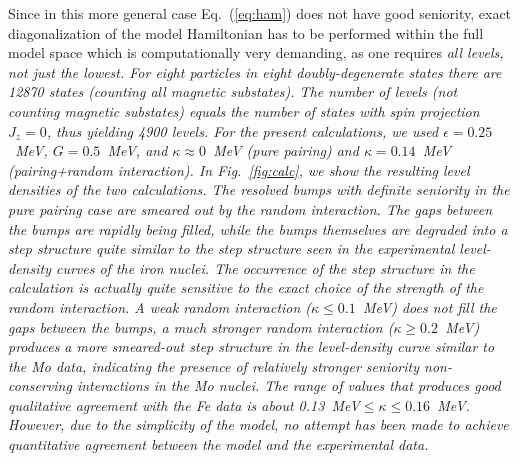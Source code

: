 \begin{multicols}{2}
Since in this more general case Eq.\ (\ref{eq:ham}) does not have good 
seniority, exact diagonalization of the model Hamiltonian has to be performed 
within the full model space which is computationally very demanding, as one 
requires \it all \rm levels, not just the lowest. For eight particles in eight 
doubly-degenerate states there are 12870 states (counting all magnetic 
substates). The number of levels (not counting magnetic substates) equals the 
number of states with spin projection $J_z=0$, thus yielding 4900 levels. For 
the present calculations, we used $\epsilon=0.25$~MeV, $G=0.5$~MeV, and 
$\kappa\approx 0$~MeV (pure pairing) and $\kappa=0.14$~MeV (pairing+random 
interaction). In Fig.\ \ref{fig:calc}, we show the resulting level densities of
the two calculations. The resolved bumps with definite seniority in the pure 
pairing case are smeared out by the random interaction. The gaps between the 
bumps are rapidly being filled, while the bumps themselves are degraded into a 
step structure quite similar to the step structure seen in the experimental 
level-density curves of the iron nuclei. The occurrence of the step structure 
in the calculation is actually quite sensitive to the exact choice of the 
strength of the random interaction. A weak random interaction 
($\kappa\le 0.1$~MeV) does not fill the gaps between the bumps, a much stronger
random interaction ($\kappa\ge 0.2$~MeV) produces a more smeared-out step 
structure in the level-density curve similar to the Mo data, indicating the 
presence of relatively stronger seniority non-conserving interactions in the Mo
nuclei. The range of values that produces good qualitative agreement with the 
Fe data is about 0.13~MeV$\le\kappa\le 0.16$~MeV\@. However, due to the 
simplicity of the model, no attempt has been made to achieve quantitative 
agreement between the model and the experimental data.


\end{multicols}
